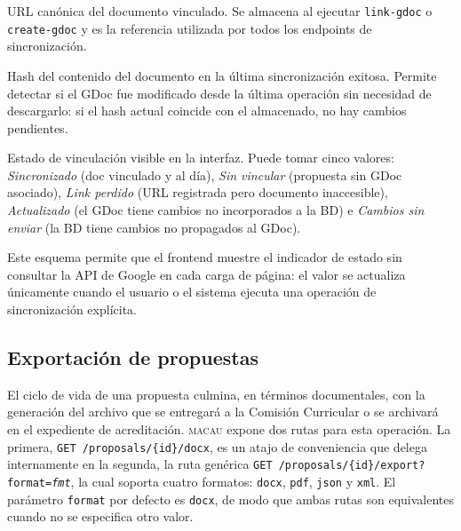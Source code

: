 \begin{description}[noitemsep, topsep=3pt]
  \item[\texttt{gdoc\_url}] URL can\'{o}nica del documento vinculado.
    Se almacena al ejecutar \texttt{link-gdoc} o \texttt{create-gdoc} y es
    la referencia utilizada por todos los endpoints de sincronizaci\'{o}n.

  \item[\texttt{gdoc\_hash}] Hash del contenido del documento en la \'{u}ltima
    sincronizaci\'{o}n exitosa. Permite detectar si el GDoc fue modificado
    desde la \'{u}ltima operaci\'{o}n sin necesidad de descargarlo: si el hash
    actual coincide con el almacenado, no hay cambios pendientes.

  \item[\texttt{gdoc\_status}] Estado de vinculaci\'{o}n visible en la
    interfaz. Puede tomar cinco valores:
    \textit{Sincronizado} (doc vinculado y al d\'{i}a),
    \textit{Sin vincular} (propuesta sin GDoc asociado),
    \textit{Link perdido} (URL registrada pero documento inaccesible),
    \textit{Actualizado} (el GDoc tiene cambios no incorporados a la BD) e
    \textit{Cambios sin enviar} (la BD tiene cambios no propagados al GDoc).
\end{description}

Este esquema permite que el frontend muestre el indicador de estado sin
consultar la API de Google en cada carga de p\'{a}gina: el valor se actualiza
\'{u}nicamente cuando el usuario o el sistema ejecuta una operaci\'{o}n de
sincronizaci\'{o}n expl\'{i}cita.

\subsection{Exportaci\'{o}n de propuestas}
\label{subsec:exportacion}

El ciclo de vida de una propuesta culmina, en t\'{e}rminos documentales,
con la generaci\'{o}n del archivo que se entregar\'{a} a la Comisi\'{o}n
Curricular o se archivar\'{a} en el expediente de acreditaci\'{o}n.
\textsc{macau} expone dos rutas para esta operaci\'{o}n.
La primera, \texttt{GET /proposals/\{id\}/docx}, es un atajo de conveniencia
que delega internamente en la segunda, la ruta gen\'{e}rica
\texttt{GET /proposals/\{id\}/export?format=\textit{fmt}}, la cual soporta
cuatro formatos: \texttt{docx}, \texttt{pdf}, \texttt{json} y \texttt{xml}.
El par\'{a}metro \texttt{format} por defecto es \texttt{docx}, de modo que
ambas rutas son equivalentes cuando no se especifica otro valor.

